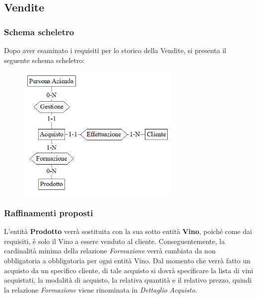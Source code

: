 \documentclass{article}
\begin{document}
\newpage
\subsection{Vendite}
\subsubsection{Schema scheletro}
Dopo aver esaminato i requisiti per lo storico della Vendite, si presenta il seguente schema scheletro:
\begin{figure}[htbp]
\centering
\includegraphics[width=0.7\textwidth]{img/Vendite_Scheletro}
\end{figure}
\subsubsection{Raffinamenti proposti}
L'entità \textbf{Prodotto} verrà sostituita con la sua sotto entità \textbf{Vino}, poiché come dai requisiti, è solo il Vino a essere venduto al cliente. Conseguentemente, la cardinalità minima della relazione \textit{Formazione} verrà cambiata da non obbligatoria a obbligatoria per ogni entità Vino.
\newline\newline
Dal momento che verrà fatto un acquisto da un specifico cliente, di tale acquisto si dovrà specificare la lista di vini acquistati, la modalità di acquisto, la relativa quantità e il relativo prezzo, quindi la relazione \textit{Formazione} viene rinominata in \textit{Dettaglio Acquisto}.
\end{document}
